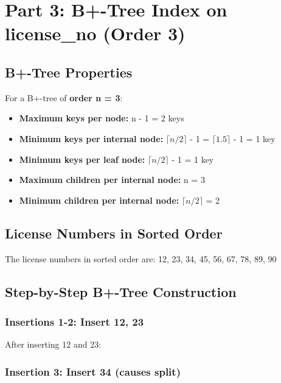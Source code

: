 \documentclass[12pt]{article}
\begin{document}
\newpage
\section{Part 3: B+-Tree Index on license\_no (Order 3)}

\subsection{B+-Tree Properties}

For a B+-tree of \textbf{order n = 3}:

\begin{itemize}
    \item \textbf{Maximum keys per node:} n - 1 = 2 keys
    \item \textbf{Minimum keys per internal node:} $\lceil n/2 \rceil$ - 1 = $\lceil 1.5 \rceil$ - 1 = 1 key
    \item \textbf{Minimum keys per leaf node:} $\lceil n/2 \rceil$ - 1 = 1 key
    \item \textbf{Maximum children per internal node:} n = 3
    \item \textbf{Minimum children per internal node:} $\lceil n/2 \rceil$ = 2
\end{itemize}

\subsection{License Numbers in Sorted Order}

The license numbers in sorted order are: 12, 23, 34, 45, 56, 67, 78, 89, 90

\subsection{Step-by-Step B+-Tree Construction}

\subsubsection{Insertions 1-2: Insert 12, 23}

After inserting 12 and 23:
\begin{center}
\fbox{[12, 23]}
\end{center}

\subsubsection{Insertion 3: Insert 34 (causes split)}
\end{document}
